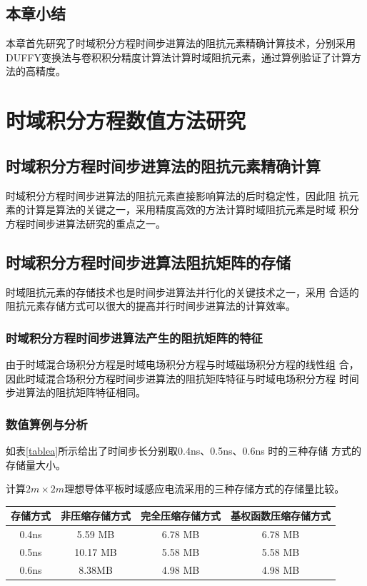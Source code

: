 \documentclass[doctor]{thesisUESTC}
\begin{document}
\section{本章小结}
本章首先研究了时域积分方程时间步进算法的阻抗元素精确计算技术，分别采用DUFFY变换法与卷积积分精度计算法计算时域阻抗元素，通过算例验证了计算方法的高精度。

\chapter{时域积分方程数值方法研究}
\section{时域积分方程时间步进算法的阻抗元素精确计算}
时域积分方程时间步进算法的阻抗元素直接影响算法的后时稳定性，因此阻
抗元素的计算是算法的关键之一，采用精度高效的方法计算时域阻抗元素是时域
积分方程时间步进算法研究的重点之一。

\section{时域积分方程时间步进算法阻抗矩阵的存储}
时域阻抗元素的存储技术也是时间步进算法并行化的关键技术之一，采用
合适的阻抗元素存储方式可以很大的提高并行时间步进算法的计算效率。

\subsection{时域积分方程时间步进算法产生的阻抗矩阵的特征}

由于时域混合场积分方程是时域电场积分方程与时域磁场积分方程的线性组
合，因此时域混合场积分方程时间步进算法的阻抗矩阵特征与时域电场积分方程
时间步进算法的阻抗矩阵特征相同。
\subsection{数值算例与分析}
如表\ref{tablea}所示给出了时间步长分别取0.4ns、0.5ns、0.6ns 时的三种存储
方式的存储量大小。

\begin{form}[h]
\caption{计算$2m\times 2m$理想导体平板时域感应电流采用的三种存储方式的存储量比较。} 
\begin{tabular}{|c|c|c|c|} 
\hline  
存储方式 & 非压缩存储方式 & 完全压缩存储方式 & 基权函数压缩存储方式 \\
\hline 
0.4ns & 5.59 MB & 6.78 MB & 6.78 MB\\  
\hline  
0.5ns & 10.17 MB & 5.58 MB & 5.58 MB \\  
\hline  
0.6ns & 8.38MB & 4.98 MB & 4.98 MB \\  
\hline  
\end{tabular}
\label{tablea}
\end{form}
\end{document}

